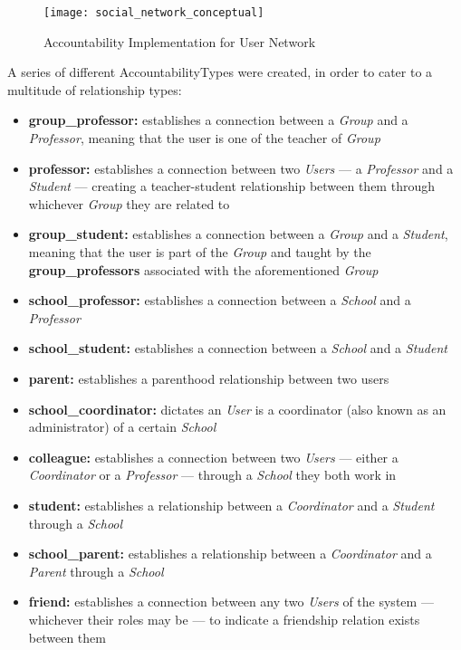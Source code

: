 \begin{figure}[H]
  \centering
  \texttt{[image: social\_network\_conceptual]}
  \caption{Accountability Implementation for User Network}
  \label{fig:social_network_conceptual}
\end{figure}

A series of different AccountabilityTypes were created, in order to cater to a multitude of relationship types:

\begin{itemize}
  \item \textbf{group\_professor:} establishes a connection between a \emph{Group} and a \emph{Professor}, meaning that the user is one of the teacher of \emph{Group}
  \item \textbf{professor:} establishes a connection between two \emph{Users} --- a \emph{Professor} and a \emph{Student} --- creating a teacher-student relationship between them through whichever \emph{Group} they are related to
  \item \textbf{group\_student:} establishes a connection between a \emph{Group} and a \emph{Student}, meaning that the user is part of the \emph{Group} and taught by the \textbf{group\_professors} associated with the aforementioned \emph{Group}
  \item \textbf{school\_professor:} establishes a connection between a \emph{School} and a \emph{Professor}
  \item \textbf{school\_student:} establishes a connection between a \emph{School} and a \emph{Student}
  \item \textbf{parent:} establishes a parenthood relationship between two users
  \item \textbf{school\_coordinator:} dictates an \emph{User} is a coordinator (also known as an administrator) of a certain \emph{School}
  \item \textbf{colleague:} establishes a connection between two \emph{Users} --- either a \emph{Coordinator} or a \emph{Professor} --- through a \emph{School} they both work in
  \item \textbf{student:} establishes a relationship between a \emph{Coordinator} and a \emph{Student} through a \emph{School}
  \item \textbf{school\_parent:} establishes a relationship between a \emph{Coordinator} and a \emph{Parent} through a \emph{School}
  \item \textbf{friend:} establishes a connection between any two \emph{Users} of the system --- whichever their roles may be --- to indicate a friendship relation exists between them
\end{itemize}


